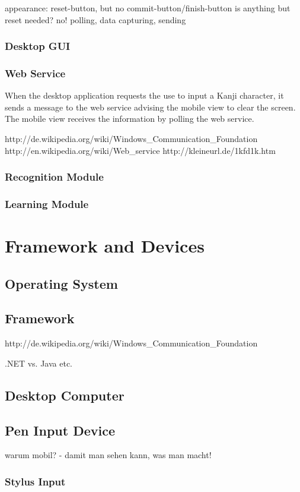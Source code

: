 appearance: reset-button, but no commit-button/finish-button
is anything but reset needed? no!
polling, 
data capturing, 
sending

\subsubsection{Desktop GUI}
\label{sec:arch:desktopgui}

\subsubsection{Web Service}
\label{sec:arch:webservice}

When the desktop application requests the use to input a Kanji 
character, it sends a message to the web service advising the mobile view to 
clear the screen. The mobile view receives the information by polling the web
service. 

http://de.wikipedia.org/wiki/Windows_Communication_Foundation
http://en.wikipedia.org/wiki/Web_service
http://kleineurl.de/1kfd1k.htm


\subsubsection{Recognition Module}
\label{sec:arch:recognitionmodule}

\subsubsection{Learning Module}
\label{sec:arch:learningmodule}

\section{Framework and Devices}
\label{sec:frameworkanddevices}

\subsection{Operating System}
\label{sec:operatingsystem}

\subsection{Framework}
\label{sec:framework}

http://de.wikipedia.org/wiki/Windows_Communication_Foundation

.NET vs. Java etc.

\subsection{Desktop Computer}
\label{sec:desktopcomputer}

\subsection{Pen Input Device}
\label{sec:peninputdevice}

warum mobil? - damit man sehen kann, was man macht!

\subsubsection{Stylus Input}
\label{sec:stylusinput}

